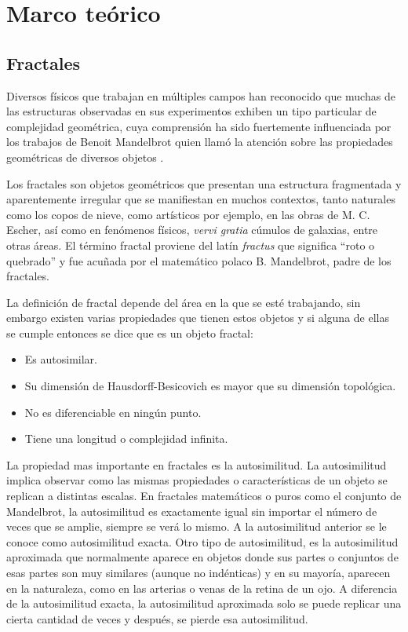 \chapter{Marco te\'{o}rico}

\section{Fractales}

Diversos físicos que trabajan en múltiples campos han reconocido que muchas de las estructuras observadas en sus experimentos exhiben un tipo particular de complejidad geométrica, cuya comprensión ha sido fuertemente influenciada por los trabajos de Benoit Mandelbrot quien llamó la atención sobre las propiedades geométricas de diversos objetos \cite{Vicsek1992}.

Los fractales son objetos geométricos que presentan una estructura fragmentada y aparentemente irregular que se manifiestan en muchos contextos, tanto naturales como los copos de nieve, como artísticos por ejemplo, en las obras de M. C. Escher, así como en fenómenos físicos, \textit{vervi gratia} cúmulos de galaxias, entre otras áreas. El término fractal  proviene del latín \textit{fractus} que significa ``roto o quebrado'' y fue acuñada por el matem\'{a}tico polaco B. Mandelbrot, padre de los fractales.

La definición de fractal depende del área en la que se esté trabajando, sin embargo existen varias propiedades que tienen estos objetos y si alguna de ellas se cumple entonces se dice que es un objeto fractal:

\begin{itemize}
	\item Es autosimilar.
	\item Su dimensión de Hausdorff-Besicovich es mayor que su dimensión topológica.
	\item No es diferenciable en ningún punto.
	\item Tiene una longitud o complejidad infinita.
\end{itemize}

La  propiedad mas importante en fractales es la autosimilitud. La autosimilitud implica observar como las mismas propiedades o caracter\'{i}sticas de un objeto se replican a distintas escalas. En fractales matem\'{a}ticos o puros como el conjunto de Mandelbrot, la autosimilitud es exactamente igual sin importar el n\'{u}mero de veces que se amplie, siempre se ver\'{a} lo mismo. A la autosimilitud anterior se le conoce como autosimilitud exacta. Otro tipo de autosimilitud, es la autosimilitud aproximada que normalmente aparece en objetos donde sus partes o conjuntos de esas partes son muy similares (aunque no ind\'{e}nticas) y en su mayor\'{i}a, aparecen en la naturaleza, como en las arterias o venas de la retina de un ojo. A diferencia de la autosimilitud exacta, la autosimilitud aproximada solo se puede replicar una cierta cantidad de veces y despu\'{e}s, se pierde esa autosimilitud.


